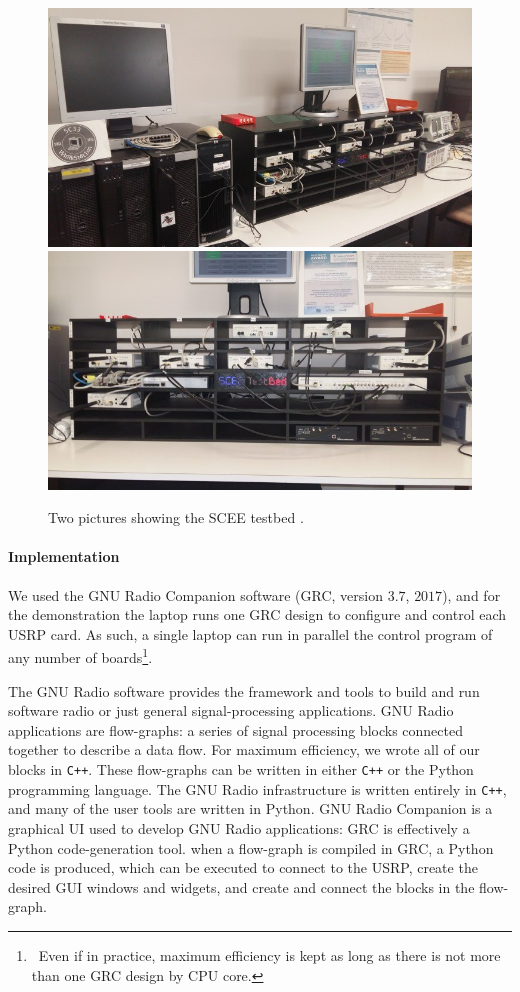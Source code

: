 \begin{figure}[!t]
    \centering
    \includegraphics[width=0.75\linewidth]{SCEE_TestBed1.jpg}
    \vspace*{20pt}
    \includegraphics[width=0.75\linewidth]{SCEE_TestBed2.jpg}
    \caption{Two pictures showing the SCEE testbed \cite[Appendix~3]{Bodinier17}.}
    \label{fig:42:photosSCEETestBed}
\end{figure}


\paragraph{Implementation}

We used the GNU Radio Companion software (GRC, version $3.7$, $2017$),
and for the demonstration the laptop runs
one GRC design to configure and control each USRP card.
As such, a single laptop can run in parallel the control program of any number of boards\footnote{~Even if in practice, maximum efficiency is kept as long as there is not more than one GRC design by CPU core.}.

The GNU Radio software provides the framework and tools to build and run software radio or just general signal-processing applications.
GNU Radio applications are flow-graphs: a series of signal processing blocks connected together to describe a data flow.
For maximum efficiency, we wrote all of our blocks in \texttt{C++}.
These flow-graphs can be written in either \texttt{C++} or the Python programming language. The GNU Radio infrastructure is written entirely in \texttt{C++}, and many of the user tools are written in Python.
GNU Radio Companion is a graphical UI used to develop GNU Radio applications:
GRC is effectively a Python code-generation tool.
when a flow-graph is compiled in GRC, a Python code is produced, which can be executed to connect to the USRP,
create the desired GUI windows and widgets, and create and connect the blocks in the flow-graph.



